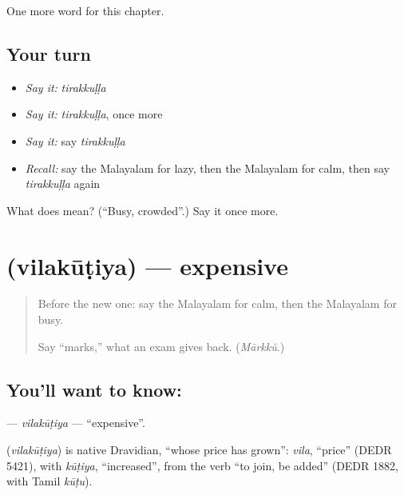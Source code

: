 \begin{grammarlens}[title={What you've built}]
One more word for this chapter.
\end{grammarlens}

\subsection*{Your turn}
\begin{itemize}
\raggedright
  \item \emph{Say it:} \emph{tirakkuḷḷa}
  \item \emph{Say it:} \emph{tirakkuḷḷa}, once more
  \item \emph{Say it:} say \emph{tirakkuḷḷa}
  \item \emph{Recall:} say the Malayalam for lazy, then the Malayalam for calm, then say \emph{tirakkuḷḷa} again
\end{itemize}

\begin{tcolorbox}[breakable,colback=teal!4,colframe=teal!35!black,title={Before you move on}]
What does  mean? (\textquotedblleft{}Busy, crowded\textquotedblright{}.) Say it once more.
\end{tcolorbox}
\section[\texorpdfstring{\ml{വിലകൂടിയ} (vilakūṭiya)}{വിലകൂടിയ (vilakūṭiya)}]{ (vilakūṭiya) — expensive}

\label{lesson:ML-C169-vilakutiya}



\begin{quote}
Before the new one: say the Malayalam for calm, then the Malayalam for busy.

Say \textquotedblleft{}marks,\textquotedblright{} what an exam gives back. (\emph{Mārkkŭ}.)
\end{quote}

\subsection*{You'll want to know: }
\textbf{} — \emph{vilakūṭiya} — \textquotedblleft{}expensive\textquotedblright{}.

\begin{cousinweb}
\textbf{} (\emph{vilakūṭiya}) is native Dravidian, \textquotedblleft{}whose price has grown\textquotedblright{}: \emph{vila}, \textquotedblleft{}price\textquotedblright{} (DEDR 5421), with \emph{kūṭiya}, \textquotedblleft{}increased\textquotedblright{}, from the verb \textquotedblleft{}to join, be added\textquotedblright{} (DEDR 1882, with Tamil \emph{kūṭu}).
\end{cousinweb}

